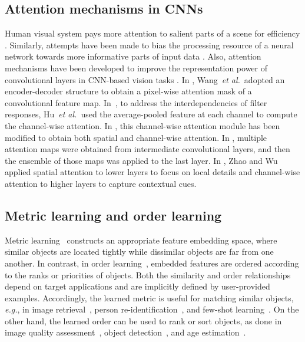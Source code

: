 \documentclass[runningheads]{llncs}
\newcommand{\etal}{\textit{et al.}}
\newcommand{\eg}{\textit{e.g.}}
\begin{document}
\subsection{Attention mechanisms in CNNs}
Human visual system pays more attention to salient parts of a scene for efficiency \cite{corbetta2002control,itti1998model}. Similarly, attempts have been made to bias the processing resource of a neural network towards more informative parts of input data \cite{bahdanau2015neural,Ashish2017,zambaldi2018deep,yu2018qanet}. Also, attention mechanisms have been developed to improve the representation power of convolutional layers in CNN-based vision tasks \cite{wang2017,hu2018,woo2018,Park2018_BMVC,Zhao2019_CVPR}. In \cite{wang2017}, Wang~\etal~adopted an encoder-decoder structure to obtain a pixel-wise attention mask of a convolutional feature map. In~\cite{hu2018}, to address the interdependencies of filter responses, Hu~\etal~used the average-pooled feature at each channel to compute the channel-wise attention. In \cite{woo2018,Park2018_BMVC}, this channel-wise attention module has been modified to obtain both spatial and channel-wise attention. In \cite{Jetley2018_ICLR}, multiple attention maps were obtained from intermediate convolutional layers, and then the ensemble of those maps was applied to the last layer. In \cite{Zhao2019_CVPR}, Zhao and Wu applied spatial attention to lower layers to focus on local details and channel-wise attention to higher layers to capture contextual cues.

\subsection{Metric learning and order learning}
Metric learning~\cite{sohn2016,oh2016} constructs an appropriate feature embedding space, where similar objects are located tightly  while dissimilar objects are far from one another. In contrast, in order learning~\cite{lim2020}, embedded features are ordered according to the ranks or priorities of  objects. Both the similarity and order relationships depend on target applications and are implicitly defined by user-provided examples. Accordingly, the learned metric is useful for matching similar objects, \eg, in image retrieval~\cite{hoi2010,gao2014soml}, person re-identification~\cite{ding2015,chu2019}, and few-shot learning~\cite{vinyals2016_nips,sung2018_CVPR}. On the other hand, the learned order can be used to rank or sort objects, as done in image quality assessment~\cite{kong2016,Liu2017_ICCV}, object detection~\cite{tan2019,singh2019}, and age estimation~\cite{Chen2017_CVPR,chen2017_tmm}.
\end{document}
